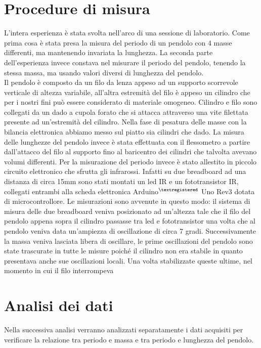 \documentclass[10pt]{article}
\begin{document}
\begin{large}
\section{Procedure di misura}
L'intera esperienza è stata svolta nell'arco di una sessione di laboratorio. Come prima cosa è stata presa la misura del periodo di un pendolo con 4 masse differenti, ma mantenendo invariata la lunghezza. La seconda parte dell'esperienza invece constava nel misurare il periodo del pendolo, tenendo la stessa massa, ma usando valori diversi di lunghezza del pendolo.
\\ Il pendolo è composto da un filo da lenza appeso ad un supporto scorrevole verticale di altezza variabile, all'altra estremità del filo è appeso un cilindro che per i nostri fini può essere considerato di materiale omogeneo. Cilindro e filo sono collegati da un dado a cupola forato che si attacca attraverso una vite filettata presente ad un'estremità del cilindro. Nella fase di pesatura delle masse con la bilancia elettronica abbiamo messo sul piatto sia cilindri che dado. La misura delle lunghezze del pendolo invece è stata effettuata con il flessometro a partire dall'attacco del filo al supporto fino al baricentro dei cilindri che talvolta avevano volumi differenti. Per la misurazione del periodo invece è stato allestito in piccolo circuito elettronico che sfrutta gli infrarossi. Infatti su due breadboard ad una distanza di circa 15mm sono stati montati un led IR e un fototransistor IR, collegati entrambi alla scheda elettronica Arduino$^{\scriptsize ®}$ Uno Rev3 dotata di microcontrollore. Le misurazioni sono avvenute in questo modo: il sistema di misura delle due breadboard veniva posizionato ad un'altezza tale che il filo del pendolo appena sopra il cilindro passasse tra led e fototransistor una volta che al pendolo veniva data un'ampiezza di oscillazione di circa 7 gradi. Successivamente la massa veniva lasciata libera di oscillare, le prime oscillazioni del pendolo sono state trascurate in tutte le misure poiché il cilindro non era stabile in quanto presentava anche sue oscillazioni locali. Una volta stabilizzate queste ultime, nel momento in cui il filo interrompeva 

\section{Analisi dei dati}
Nella successiva analisi verranno analizzati separatamente i dati acquisiti per verificare la relazione tra periodo e massa e tra periodo e lunghezza del pendolo.



\end{large}
\end{document}

